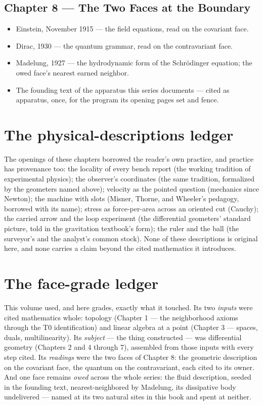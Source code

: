 \subsection*{Chapter 8 --- The Two Faces at the Boundary}
\begin{itemize}
\item Einstein, November 1915 --- the field equations, read on the
covariant face. \item Dirac, 1930 --- the quantum grammar, read on the
contravariant face. \item Madelung, 1927 --- the hydrodynamic form of the
Schr\"odinger equation; the owed face's nearest earned neighbor.
\item The founding text of the apparatus this series documents --- cited
as apparatus, once, for the program its opening pages set and fence.
\end{itemize}

\section*{The physical-descriptions ledger}

The openings of these chapters borrowed the reader's own practice, and
practice has provenance too: the locality of every bench report (the
working tradition of experimental physics); the observer's coordinates
(the same tradition, formalized by the geometers named above); velocity
as the pointed question (mechanics since Newton); the machine with slots
(Misner, Thorne, and Wheeler's pedagogy, borrowed with its name);
stress as force-per-area across an oriented cut (Cauchy); the carried
arrow and the loop experiment (the differential geometers' standard
picture, told in the gravitation textbook's form); the ruler and the
ball (the surveyor's and the analyst's common stock). None of these
descriptions is original here, and none carries a claim beyond the cited
mathematics it introduces.

\section*{The face-grade ledger}

This volume used, and here grades, exactly what it touched. Its two
\emph{inputs} were cited mathematics whole: topology (Chapter 1 --- the
neighborhood axioms through the T0 identification) and linear algebra at
a point (Chapter 3 --- spaces, duals, multilinearity). Its
\emph{subject} --- the thing constructed --- was differential geometry
(Chapters 2 and 4 through 7), assembled from those inputs with every
step cited. Its \emph{readings} were the two faces of Chapter 8: the
geometric description on the covariant face, the quantum on the
contravariant, each cited to its owner. And one face remains \emph{owed}
across the whole series: the fluid description, seeded in the founding
text, nearest-neighbored by Madelung, its dissipative body
undelivered --- named at its two natural sites in this book and spent at
neither.

